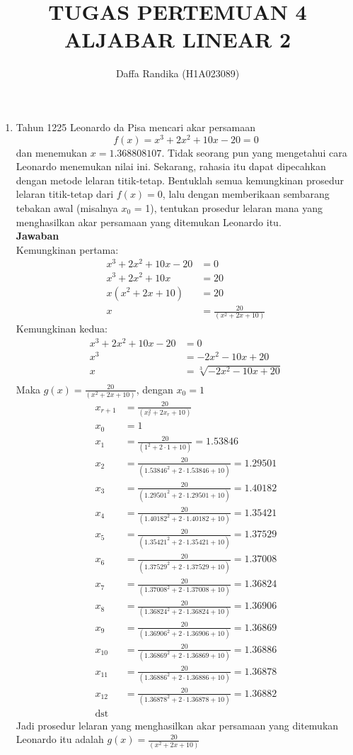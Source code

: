 \documentclass[fleqn]{article}
\author{Daffa Randika (H1A023089)}
\date{}
\title{TUGAS PERTEMUAN 4 ALJABAR LINEAR 2}
\newcommand{\jaw}{\\ \textbf{Jawaban} \\}
\begin{document}
    \maketitle
	\begin{enumerate}
		\item Tahun 1225 Leonardo da Pisa mencari akar persamaan
			\[
				f(x) = x^3 + 2x^2 + 10x - 20 = 0
			\]
			dan menemukan $x = 1.368808107$. Tidak seorang pun yang mengetahui cara Leonardo menemukan nilai ini. Sekarang, rahasia itu dapat dipecahkan dengan metode lelaran titik-tetap. Bentuklah semua kemungkinan prosedur lelaran titik-tetap dari $f(x) = 0$, lalu dengan memberikaan sembarang tebakan awal (misalnya $x_0$ = 1), tentukan prosedur lelaran mana yang menghasilkan akar persamaan yang ditemukan Leonardo itu.
			\jaw
			Kemungkinan pertama:
			\begin{align*}
				x^3 + 2x^2 + 10x - 20 &= 0 \\
				x^3 + 2x^2 + 10x &= 20 \\
				x(x^2 + 2x + 10) &= 20 \\
				x &= \frac{20}{(x^2 + 2x + 10)} 
			\end{align*}
			Kemungkinan kedua:
			\begin{align*}
				x^3 + 2x^2 + 10x - 20 &= 0 \\
				x^3 &= - 2x^2 - 10x + 20 \\
				x &= \sqrt[3]{- 2x^2 - 10x + 20} \\
			\end{align*}
			Maka $g(x)=\frac{20}{(x^2+2x+10)}$, dengan $x_0 = 1$ \\ 
			\begin{align*}
				x_{r+1} &= \frac{20}{(x_r^2+2x_r+10)} \\
				x_{0} &= 1 \\
				x_{1} &= \frac{20}{(1^2+2\cdot 1+10)} = 1.53846 \\
				x_{2} &= \frac{20}{(1.53846^2+2\cdot 1.53846+10)} = 1.29501 \\
				x_{3} &= \frac{20}{(1.29501^2+2\cdot 1.29501+10)} = 1.40182 \\
				x_{4} &= \frac{20}{(1.40182^2+2\cdot 1.40182+10)} = 1.35421 \\
				x_{5} &= \frac{20}{(1.35421^2+2\cdot 1.35421+10)} = 1.37529 \\
				x_{6} &= \frac{20}{(1.37529^2+2\cdot 1.37529+10)} = 1.37008 \\
				x_{7} &= \frac{20}{(1.37008^2+2\cdot 1.37008+10)} = 1.36824 \\
				x_{8} &= \frac{20}{(1.36824^2+2\cdot 1.36824+10)} = 1.36906 \\
				x_{9} &= \frac{20}{(1.36906^2+2\cdot 1.36906+10)} = 1.36869 \\
				x_{10} &= \frac{20}{(1.36869^2+2\cdot 1.36869+10)} = 1.36886 \\
				x_{11} &= \frac{20}{(1.36886^2+2\cdot 1.36886+10)} = 1.36878 \\
				x_{12} &= \frac{20}{(1.36878^2+2\cdot 1.36878+10)} = 1.36882 \\ 
				\text{dst}
			\end{align*}
			Jadi prosedur lelaran yang menghasilkan akar persamaan yang ditemukan Leonardo itu adalah $g(x)=\frac{20}{(x^2+2x+10)}$


\end{enumerate}
\end{document}
